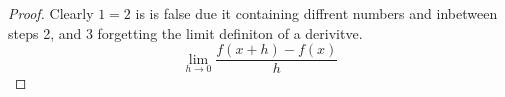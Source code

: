 \documentclass{article}
\begin{document}
\begin{proof}
    Clearly $1=2$ is is false due it containing diffrent numbers
    and inbetween steps 2, and 3 forgetting the limit definiton of a derivitve.
    \[ \lim_{h\to0} \frac{f(x+h)-f(x)}{h} \] 
    \end{proof}

\newpage
\end{document}
